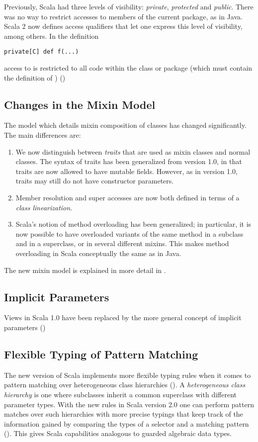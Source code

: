 Previously, Scala had three levels of visibility: {\em private},
{\em protected} and {\em public}. There was no way to
restrict accesses to members of the current package, as in Java. Scala
2 now defines access qualifiers that let one express this level of
visibility, among others. In the definition
\begin{lstlisting}
private[C] def f(...)
\end{lstlisting}
access to \lstinline@f@ is restricted to all code within the class or
package \lstinline@C@ (which must contain the definition of
\lstinline@f@) ()

\subsection*{Changes in the Mixin Model}\label{sec:mixin-classes}

The model which details mixin composition of classes has changed
significantly. The main differences are:
\begin{enumerate}
\item
We now distinguish between {\em traits} that are used as mixin classes
and normal classes. The syntax of traits has been generalized from
version 1.0, in that traits are now allowed to have mutable
fields. However, as in version 1.0, traits may still do not have
constructor parameters.
\item
Member resolution and super accesses are now both defined in terms of
a {\em class linearization}. 
\item
Scala's notion of method overloading has been generalized; in
 particular, it is now possible to have overloaded variants of the
 same method in a subclass and in a superclass, or in several different
 mixins. This makes method overloading in Scala conceptually the
 same as in Java.
\end{enumerate}
The new mixin model is explained in more detail in
.

\subsection*{Implicit Parameters}

Views in Scala 1.0 have been replaced by the more general concept of
implicit parameters ()

\subsection*{Flexible Typing of Pattern Matching}

The new version of Scala implements more flexible typing rules when it
comes to pattern matching over heterogeneous class hierarchies
(). A {\em heterogeneous class hierarchy} is
one where subclasses inherit a common superclass with different
parameter types.  With the new rules in Scala version 2.0 one can
perform pattern matches over such hierarchies with more precise
typings that keep track of the information gained by comparing the
types of a selector and a matching pattern ().
This gives Scala capabilities analogous to guarded algebraic data types.



